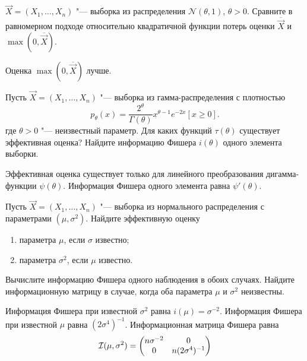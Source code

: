 \begin{problem}
    $\vec{X} = (X_{1}, \ldots, X_{n})$ "--- выборка из распределения $\mathcal{N}(\theta, 1)$, $\theta > 0$. Сравните в равномерном подходе относительно квадратичной функции потерь оценки $\overline{\vec{X}}$ и $\max(0, \overline{\vec{X}})$.
\end{problem}
\begin{answer}
    Оценка $\max(0, \overline{\vec{X}})$ лучше.
\end{answer}

\begin{problem}
    Пусть $\vec{X} = (X_{1}, \ldots, X_{n})$ "--- выборка из гамма-распределения с плотностью
    \[
        p_{\theta}(x) 
        = \frac{2^{\theta}}{\Gamma(\theta)}x^{\theta - 1}e^{-2x}[x \geq 0].
    \]
    где $\theta > 0$ "--- неизвестный параметр. Для каких функций $\tau(\theta)$ существует эффективная оценка? Найдите информацию Фишера $i(\theta)$ одного элемента выборки.
\end{problem}
\begin{answer}
    Эффективная оценка существует только для линейного преобразования дигамма-функции $\psi(\theta)$. Информация Фишера одного элемента равна $\psi'(\theta)$.
\end{answer}

\begin{problem}
    Пусть $\vec{X} = (X_{1}, \ldots, X_{n})$ "--- выборка из нормального распределения с параметрами $(\mu, \sigma^{2})$. Найдите эффективную оценку
    \begin{enumerate}[label=(\alph*)]
        \item параметра $\mu$, если $\sigma$ известно;
        \item параметра $\sigma^{2}$, если $\mu$ известно.
    \end{enumerate}
    Вычислите информацию Фишера одного наблюдения в обоих случаях. Найдите информационную матрицу в случае, когда оба параметра $\mu$ и $\sigma^{2}$ неизвестны.
\end{problem}
\begin{answer}
    Информация Фишера при известной $\sigma^{2}$ равна $i(\mu) = \sigma^{-2}$. Информация Фишера при известной $\mu$ равна $(2\sigma^{4})^{-1}$. Информационная матрица Фишера равна
    \[
        \mathbf{\mathcal{I}}(\mu, \sigma^{2})
        = \begin{pmatrix}
            n\sigma^{-2} & 0 \\
            0 & n(2\sigma^{4})^{-1}
        \end{pmatrix}
    \]
\end{answer}

